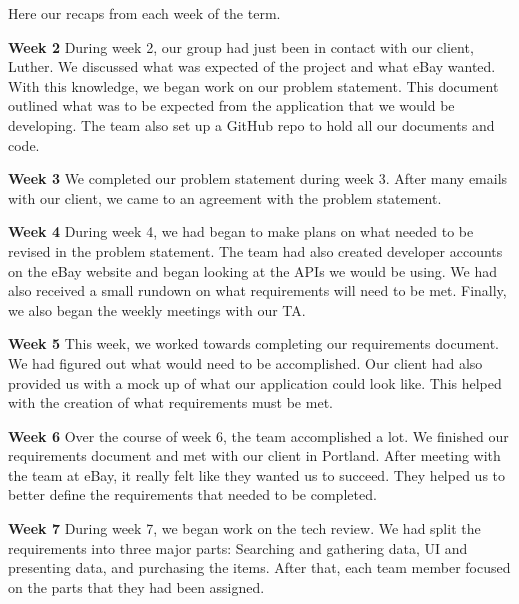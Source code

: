 \documentclass[journal,compsoc, 10pt, draftclsnofoot, onecolumn]{IEEEtran}
\begin{document}
Here our recaps from each week of the term. \newline

\textbf{Week 2}\newline
During week 2, our group had just been in contact with our client, Luther. We 
discussed what was expected of the project and what eBay wanted. With this 
knowledge, we began work on our problem statement. This document outlined 
what was to be expected from the application that we would be developing. The 
team also set up a GitHub repo to hold all our documents and code. \newline

\textbf{Week 3}\newline
We completed our problem statement during week 3. After many emails with our 
client, we came to an agreement with the problem statement.  \newline

\textbf{Week 4}\newline
During week 4, we had began to make plans on what needed to be revised in the 
problem statement. The team had also created developer accounts on the eBay 
website and began looking at the APIs we would be using. We had also received 
a small rundown on what requirements will need to be met. Finally, we also began 
the weekly meetings with our TA.\newline

\textbf{Week 5}\newline
This week, we worked towards completing our requirements document. We had 
figured out what would need to be accomplished. Our client had also provided us 
with a mock up of what our application could look like. This helped with the 
creation of what requirements must be met.\newline

\textbf{Week 6}\newline
Over the course of week 6, the team accomplished a lot. We finished our 
requirements document and met with our client in Portland. After meeting with 
the team at eBay, it really felt like they wanted us to succeed. They helped us 
to better define the requirements that needed to be completed.\newline

\textbf{Week 7}\newline
During week 7, we began work on the tech review. We had split the requirements 
into three major parts: Searching and gathering data, UI and presenting data, and 
purchasing the items. After that, each team member focused on the parts that they 
had been assigned. \newline
\end{document}

